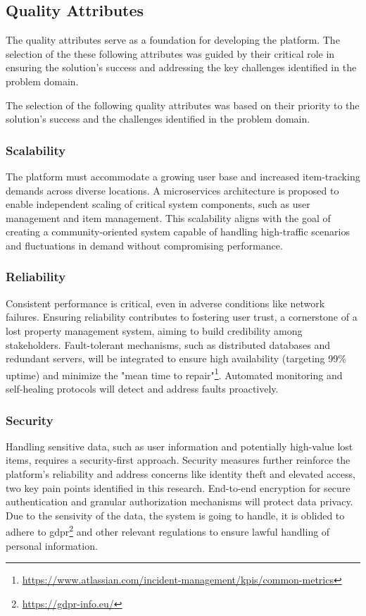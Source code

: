 \subsection{Quality Attributes} \label{section:quality_attributes}

The quality attributes serve as a foundation for developing the platform. The selection of the these following attributes was guided by their critical role in ensuring the solution's success and addressing the key challenges identified in the problem domain.

The selection of the following quality attributes was based on their priority to the solution's success and the challenges identified in the problem domain.

\subsubsection{Scalability}

The platform must accommodate a growing user base and increased item-tracking demands across diverse locations. A microservices architecture is proposed to enable independent scaling of critical system components, such as user management and item management. This scalability aligns with the goal of creating a community-oriented system capable of handling high-traffic scenarios and fluctuations in demand without compromising performance.

\subsubsection{Reliability} 

Consistent performance is critical, even in adverse conditions like network failures. Ensuring reliability contributes to fostering user trust, a cornerstone of a lost property management system, aiming to build credibility among stakeholders. Fault-tolerant mechanisms, such as distributed databases and redundant servers, will be integrated to ensure high availability (targeting 99\% uptime) and minimize the "mean time to repair"\footnote{\url{https://www.atlassian.com/incident-management/kpis/common-metrics}}. Automated monitoring and self-healing protocols will detect and address faults proactively.

\subsubsection{Security}

Handling sensitive data, such as user information and potentially high-value lost items, requires a security-first approach. Security measures further reinforce the platform's reliability and address concerns like identity theft and elevated access, two key pain points identified in this research. End-to-end encryption for secure authentication and granular authorization mechanisms will protect data privacy. Due to the sensivity of the data, the system is going to handle, it is oblided to adhere to \ac{gdpr}\footnote{\url{https://gdpr-info.eu/}} and other relevant regulations to ensure lawful handling of personal information.

